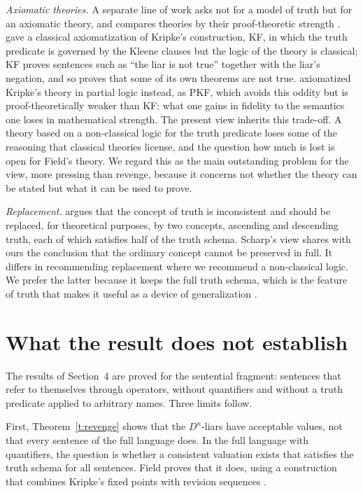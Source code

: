 \documentclass{situationist-preprint}
\begin{document}
\emph{Axiomatic theories.} A separate line of work asks not for a model of truth but for an axiomatic theory, and compares theories by their proof-theoretic strength \citep{Halbach2011}. \citet{Feferman1991} gave a classical axiomatization of Kripke's construction, KF, in which the truth predicate is governed by the Kleene clauses but the logic of the theory is classical; KF proves sentences such as \enquote{the liar is not true} together with the liar's negation, and so proves that some of its own theorems are not true. \citet{HalbachHorsten2006} axiomatized Kripke's theory in partial logic instead, as PKF, which avoids this oddity but is proof-theoretically weaker than KF: what one gains in fidelity to the semantics one loses in mathematical strength. The present view inherits this trade-off. A theory based on a non-classical logic for the truth predicate loses some of the reasoning that classical theories license, and the question how much is lost is open for Field's theory. We regard this as the main outstanding problem for the view, more pressing than revenge, because it concerns not whether the theory can be stated but what it can be used to prove.

\emph{Replacement.} \citet{Scharp2013} argues that the concept of truth is inconsistent and should be replaced, for theoretical purposes, by two concepts, ascending and descending truth, each of which satisfies half of the truth schema. Scharp's view shares with ours the conclusion that the ordinary concept cannot be preserved in full. It differs in recommending replacement where we recommend a non-classical logic. We prefer the latter because it keeps the full truth schema, which is the feature of truth that makes it useful as a device of generalization \citep{Field2008}.

\section{What the result does not establish}\label{s:limits}

The results of Section~4 are proved for the sentential fragment: sentences that refer to themselves through operators, without quantifiers and without a truth predicate applied to arbitrary names. Three limits follow.

First, Theorem~\ref{t:revenge} shows that the $D^n$-liars have acceptable values, not that every sentence of the full language does. In the full language with quantifiers, the question is whether a consistent valuation exists that satisfies the truth schema for all sentences. Field proves that it does, using a construction that combines Kripke's fixed points with revision sequences \citep{Field2008}.
\end{document}
